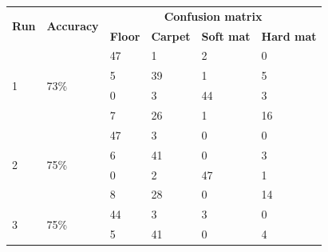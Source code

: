 \documentclass[USenglish]{ifimaster}  %
\begin{document}
\begin{table}[h]\ContinuedFloat
	\begin{subtable}[h]{1\textwidth} 
		\centering
		\captionsetup{justification=centering}
		\begin{tabular}{@{}llllll@{}}
			\toprule
			\multirow{2}{*}{\textbf{Run}} & \multirow{2}{*}{\textbf{Accuracy}} & \multicolumn{4}{c}{\textbf{Confusion matrix}} \\ \cmidrule(l){3-6} 
			&  & \multicolumn{1}{l|}{\textbf{Floor}} & \multicolumn{1}{l|}{\textbf{Carpet}} & \multicolumn{1}{l|}{\textbf{Soft mat}} & \textbf{Hard mat} \\ \midrule
			\multicolumn{1}{l|}{\multirow{4}{*}{1}} & \multicolumn{1}{l|}{\multirow{4}{*}{73\%}} & \multicolumn{1}{l|}{47} & \multicolumn{1}{l|}{1} & \multicolumn{1}{l|}{2} & 0 \\ \cmidrule(l){3-6} 
			\multicolumn{1}{l|}{} & \multicolumn{1}{l|}{} & \multicolumn{1}{l|}{5} & \multicolumn{1}{l|}{39} & \multicolumn{1}{l|}{1} & 5 \\ \cmidrule(l){3-6} 
			\multicolumn{1}{l|}{} & \multicolumn{1}{l|}{} & \multicolumn{1}{l|}{0} & \multicolumn{1}{l|}{3} & \multicolumn{1}{l|}{44} & 3 \\ \cmidrule(l){3-6} 
			\multicolumn{1}{l|}{} & \multicolumn{1}{l|}{} & \multicolumn{1}{l|}{7} & \multicolumn{1}{l|}{26} & \multicolumn{1}{l|}{1} & 16 \\ \midrule
			\multicolumn{1}{l|}{\multirow{4}{*}{2}} & \multicolumn{1}{l|}{\multirow{4}{*}{75\%}} & \multicolumn{1}{l|}{47} & \multicolumn{1}{l|}{3} & \multicolumn{1}{l|}{0} & 0 \\ \cmidrule(l){3-6} 
			\multicolumn{1}{l|}{} & \multicolumn{1}{l|}{} & \multicolumn{1}{l|}{6} & \multicolumn{1}{l|}{41} & \multicolumn{1}{l|}{0} & 3 \\ \cmidrule(l){3-6} 
			\multicolumn{1}{l|}{} & \multicolumn{1}{l|}{} & \multicolumn{1}{l|}{0} & \multicolumn{1}{l|}{2} & \multicolumn{1}{l|}{47} & 1 \\ \cmidrule(l){3-6} 
			\multicolumn{1}{l|}{} & \multicolumn{1}{l|}{} & \multicolumn{1}{l|}{8} & \multicolumn{1}{l|}{28} & \multicolumn{1}{l|}{0} & 14 \\ \midrule
			\multicolumn{1}{l|}{\multirow{4}{*}{3}} & \multicolumn{1}{l|}{\multirow{4}{*}{75\%}} & \multicolumn{1}{l|}{44} & \multicolumn{1}{l|}{3} & \multicolumn{1}{l|}{3} & 0 \\ \cmidrule(l){3-6} 
			\multicolumn{1}{l|}{} & \multicolumn{1}{l|}{} & \multicolumn{1}{l|}{5} & \multicolumn{1}{l|}{41} & \multicolumn{1}{l|}{0} & 4 \\ \cmidrule(l){3-6} 

\end{tabular}
\end{subtable}
\end{table}
\end{document}
